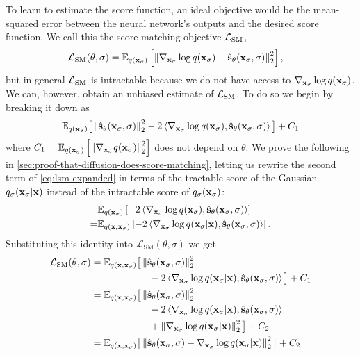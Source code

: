 To learn to estimate the score function, an ideal objective would be the mean-squared error between the neural network's outputs and the desired score function. We call this the score-matching objective ${\mathcal{L}}_\text{SM}$,
\begin{align}
    \mathcal{L}_\text{SM}(\theta, \sigma) &= \mathbb{E}_{q({\mathbf{x}}_\sigma)} \left[ \left\| \nabla_{{\mathbf{x}}_\sigma} \log q({\mathbf{x}}_\sigma) - \hat{{\mathbf{s}}}_\theta({\mathbf{x}}_\sigma, \sigma) \right\|_2^2 \right],
\end{align}
but in general ${\mathcal{L}}_\text{SM}$ is intractable because we do not have access to $\nabla_{{\mathbf{x}}_\sigma} \log q({\mathbf{x}}_\sigma)$. We can, however, obtain an unbiased estimate of ${\mathcal{L}}_\text{SM}$. To do so we begin by breaking it down as
\begin{align} \label{eq:lsm-expanded}
    \mathbb{E}_{q({\mathbf{x}}_\sigma)} \big[ 
    \left\| \hat{{\mathbf{s}}}_\theta({\mathbf{x}}_\sigma, \sigma) \right\|_2^2
    - 2 \left\langle \nabla_{{\mathbf{x}}_\sigma} \log q({\mathbf{x}}_\sigma),
    \hat{{\mathbf{s}}}_\theta({\mathbf{x}}_\sigma, \sigma) \right\rangle \big]
    + C_1
\end{align}
where $C_1 = \mathbb{E}_{q({\mathbf{x}}_\sigma)} \left[ \left\| \nabla_{{\mathbf{x}}_\sigma} q({\mathbf{x}}_\sigma) \right\|_2^2 \right]$ does not depend on $\theta$. We prove the following in \cref{sec:proof-that-diffusion-does-score-matching}, letting us rewrite the second term of \cref{eq:lsm-expanded} in terms of the tractable score of the Gaussian $q_{\sigma}({\mathbf{x}}_\sigma|{\mathbf{x}})$ instead of the intractable score of $q_{\sigma}({\mathbf{x}}_\sigma)$:
\begin{align}
\allowdisplaybreaks
    &\EX_{q(\rvx_\sigma)} \left[ - 2 \left\langle \nabla_{\rvx_\sigma} \log q(\rvx_\sigma), \preds_\theta(\rvx_\sigma, \sigma) \right\rangle \right] \\
    =& \EX_{q(\rvx, \rvx_\sigma)} \left[ -2 \left\langle \nabla_{\rvx_\sigma} \log q(\rvx_\sigma|\rvx), \preds_\theta(\rvx_\sigma, \sigma) \right\rangle  \right]. \nonumber
\end{align}
Substituting this identity into $\mathcal{L}_\text{SM}(\theta, \sigma)$ we get
\begin{align}
    \mathcal{L}_\text{SM}(\theta, \sigma) &= \mathbb{E}_{q({\mathbf{x}}, {\mathbf{x}}_\sigma)} \big[ 
    \left\| \hat{{\mathbf{s}}}_\theta({\mathbf{x}}_\sigma, \sigma) \right\|_2^2
    \\ &\qquad\qquad\qquad\nonumber
    - 2 \left\langle \nabla_{{\mathbf{x}}_\sigma} \log q({\mathbf{x}}_\sigma|{\mathbf{x}}), \hat{{\mathbf{s}}}_\theta({\mathbf{x}}_\sigma, \sigma) \right\rangle \big] + C_1 \\
    &= \mathbb{E}_{q({\mathbf{x}}, {\mathbf{x}}_\sigma)} \big[ 
    \left\| \hat{{\mathbf{s}}}_\theta({\mathbf{x}}_\sigma, \sigma) \right\|_2^2
    \\ &\qquad\qquad\qquad
    - 2 \left\langle \nabla_{{\mathbf{x}}_\sigma} \log q({\mathbf{x}}_\sigma|{\mathbf{x}}), \hat{{\mathbf{s}}}_\theta({\mathbf{x}}_\sigma, \sigma) \right\rangle
    \nonumber\\ &\qquad\qquad\qquad
    + \left\| \nabla_{{\mathbf{x}}_\sigma} \log q({\mathbf{x}}_\sigma|{\mathbf{x}}) \right\|_2^2 \big] + C_2 \nonumber \\
    &= \mathbb{E}_{q({\mathbf{x}}, {\mathbf{x}}_\sigma)} \big[ 
    \left\| \hat{{\mathbf{s}}}_\theta({\mathbf{x}}_\sigma, \sigma) - \nabla_{{\mathbf{x}}_\sigma} \log q({\mathbf{x}}_\sigma|{\mathbf{x}}) \right\|_2^2 \big] + C_2
\end{align}
